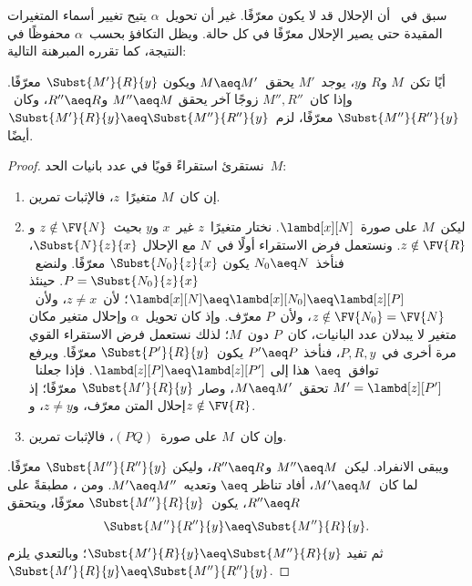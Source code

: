 \documentclass[../../../include/open-logic-section]{subfiles}
\begin{document}
سبق في~ أن الإحلال قد لا يكون معرّفًا.
غير أن تحويل~$\alpha$ يتيح تغيير أسماء المتغيرات المقيدة حتى يصير الإحلال معرّفًا في كل حالة.
ويظل التكافؤ بحسب~$\alpha$ محفوظًا في النتيجة، كما تقرره المبرهنة التالية:

\begin{thm}
  أيًا تكن~$M$ و$R$ و$y$، يوجد~$M'$ يحقق~$M \aeq M'$ ويكون
  $\Subst{M'}{R}{y}$ معرّفًا. وإذا كان~$M'',R''$ زوجًا آخر يحقق
  $M'' \aeq M$ و$R'' \aeq R$، وكان~$\Subst{M''}{R''}{y}$ معرّفًا،
  لزم~$\Subst{M'}{R}{y} \aeq \Subst{M''}{R''}{y}$ أيضًا.
\end{thm}

\begin{proof}
  نستقرئ استقراءً قويًا في عدد بانيات الحد~$M$:
  \begin{enumerate}
  \item إن كان~$M$ متغيرًا~$z$، فالإثبات تمرين.
  \item ليكن~$M$ على صورة~$\lambd[x][N]$. نختار متغيرًا~$z$
    غير~$x$ و$y$ بحيث~$z \notin \FV{N}$ و$z \notin \FV{R}$.
    ونستعمل فرض الاستقراء أولًا في~$N$ مع الإحلال
    $\Subst{N}{z}{x}$، فنأخذ~$N_0 \aeq N$ يكون
    $\Subst{N_0}{z}{x}$ معرّفًا. ولنضع~$P=\Subst{N_0}{z}{x}$.
    حينئذ
    $\lambd[x][N] \aeq \lambd[x][N_0] \aeq \lambd[z][P]$؛
    لأن~$z\ne x$، ولأن~$z\notin\FV{N_0}=\FV{N}$، ولأن~$P$ معرّف.
    وإذ كان تحويل~$\alpha$ وإحلال متغير مكان متغير لا يبدلان عدد
    البانيات، كان~$P$ دون~$M$؛ لذلك نستعمل فرض الاستقراء القوي مرة
    أخرى في~$P,R,y$، فنأخذ
    $P'\aeq P$ يكون~$\Subst{P'}{R}{y}$ معرّفًا.
    ويرفع توافق~$\aeq$ هذا إلى
    $\lambd[z][P]\aeq\lambd[z][P']$.
    فإذا جعلنا~$M'=\lambd[z][P']$ تحقق~$M\aeq M'$، وصار
    $\Subst{M'}{R}{y}$ معرّفًا؛ إذ إحلال المتن معرّف، و$z\ne y$،
    و$z\notin\FV{R}$.

    \item وإن كان~$M$ على صورة~$(PQ)$، فالإثبات تمرين.
  \end{enumerate}

  ويبقى الانفراد. ليكن~$M''\aeq M$ و$R''\aeq R$، وليكن
  $\Subst{M''}{R''}{y}$ معرّفًا. لما كان~$M'\aeq M$، أفاد تناظر
  $\aeq$ وتعديه~$M'\aeq M''$. ومن ، مطبقةً على
  $R''\aeq R$، يكون~$\Subst{M''}{R}{y}$ معرّفًا، ويتحقق
  \[
    \Subst{M''}{R''}{y}\aeq\Subst{M''}{R}{y}.
  \]
  ثم تفيد 
  $\Subst{M'}{R}{y}\aeq\Subst{M''}{R}{y}$؛ وبالتعدي يلزم
  $\Subst{M'}{R}{y}\aeq\Subst{M''}{R''}{y}$.
\end{proof}
\end{document}
